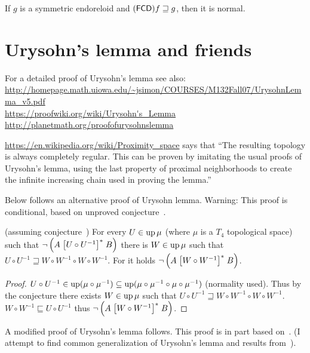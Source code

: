 \begin{cor}
If $g$ is a symmetric endoreloid and $(\mathsf{FCD}) f\sqsupseteq g$, then it is normal.
\end{cor}

\section{Urysohn's lemma and friends}

For a detailed proof of Urysohn's lemma see also:\\
\url{http://homepage.math.uiowa.edu/~jsimon/COURSES/M132Fall07/UrysohnLemma_v5.pdf}\\
\url{https://proofwiki.org/wiki/Urysohn's_Lemma}\\
\url{http://planetmath.org/proofofurysohnslemma}

\url{https://en.wikipedia.org/wiki/Proximity_space} says that
``The resulting topology is always completely regular. This can be proven by imitating the usual proofs of Urysohn's lemma, using the last property of proximal neighborhoods to create the infinite increasing chain used in proving the lemma.''

Below follows an alternative proof of Urysohn lemma. Warning: This proof is conditional,
based on unproved conjecture~.

\begin{lem}
  (assuming conjecture~) For every $U \in \operatorname{up} \mu$ (where $\mu$ is a $T_4$ topological space) such that
  $\neg \left( A \mathrel{\left[U \circ U^{- 1}\right]^{\ast}} B \right)$ there is $W \in
  \operatorname{up} \mu$ such that $U \circ U^{- 1} \sqsupseteq W \circ W^{- 1}
  \circ W \circ W^{- 1}$. For it holds $\neg \left( A \mathrel{\left[W \circ W^{-
  1}\right]^{\ast}} B \right)$.
\end{lem}

\begin{proof}
  $U \circ U^{- 1} \in \operatorname{up} (\mu \circ \mu^{- 1}) \subseteq
  \operatorname{up} (\mu \circ \mu^{- 1} \circ \mu \circ
  \mu^{- 1})$ (normality used). Thus by the conjecture there exists $W
  \in \operatorname{up} \mu$ such that $U \circ U^{- 1} \sqsupseteq W \circ W^{-
  1} \circ W \circ W^{- 1}$. $W \circ W^{- 1} \sqsubseteq U \circ U^{- 1}$
  thus $\neg \left( A \mathrel{\left[W \circ W^{- 1}\right]^{\ast}} B \right)$.
\end{proof}

A modified proof of Urysohn's lemma follows. This proof is in part based on~\cite{2014arXiv1410.1504B}.
(I attempt to find common generalization of Urysohn's lemma and results from~\cite{2014arXiv1410.1504B}).

